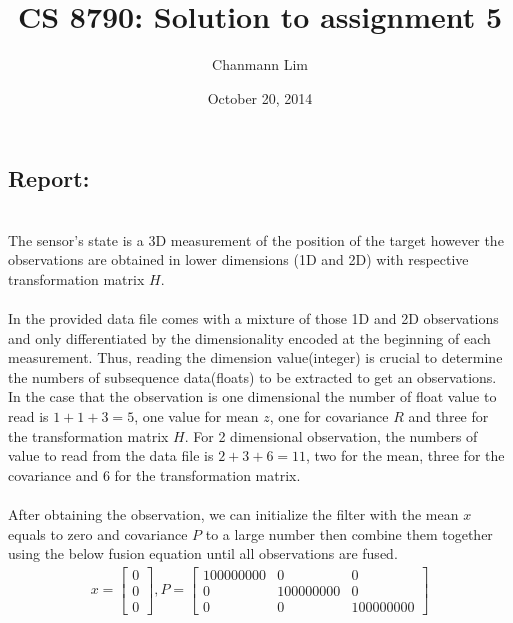 \documentclass[a4paper]{article}
\begin{document}
\title{CS 8790: Solution to assignment 5}
\author{Chanmann Lim}
\date{October 20, 2014}
\maketitle

\subsection*{Report:} ~\\
\indent The sensor's state is a 3D measurement of the position of the target however the observations are obtained in lower dimensions (1D and 2D) with respective transformation matrix $H$. \\
\\
\indent In the provided data file comes with a mixture of those 1D and 2D observations and only differentiated by the dimensionality encoded at the beginning of each measurement. Thus, reading the dimension value(integer) is crucial to determine the numbers of subsequence data(floats) to be extracted to get an observations. In the case that the observation is one dimensional the number of float value to read is $1+1+3=5$, one value for mean $z$, one for covariance $R$ and three for the transformation matrix $H$. For 2 dimensional observation, the numbers of value to read from the data file is $2+3+6=11$, two for the mean, three for the covariance and 6 for the transformation matrix.\\
\\
\indent After obtaining the observation, we can initialize the filter with the mean $x$ equals to zero and covariance $P$ to a large number then combine them together using the below fusion equation until all observations are fused.\\
\begin{align*}
x = \begin{bmatrix}
		0   \\  0   \\   0
	\end{bmatrix}, 
P = \begin{bmatrix}
		100000000   &  0   &   0 \\
		0   &  100000000   &   0 \\
		0   &  0   &   100000000
	\end{bmatrix}
\end{align*}
\end{document}
